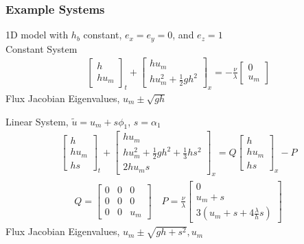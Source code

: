 \documentclass[10pt]{beamer}
\begin{document}
      \begin{frame}
        \frametitle{Example Systems}
        1D model with \(h_b\) constant, \(e_x = e_y = 0\), and \(e_z = 1\) \\
        Constant System
        \begin{align*}
          \begin{bmatrix}
            h \\
            h u_m
          \end{bmatrix}_t +
          \begin{bmatrix}
            h u_m \\
            h u_m^2 + \frac{1}{2} g h^2
          \end{bmatrix}_x =
          -\frac{\nu}{\lambda}
          \begin{bmatrix}
            0 \\
            u_m
          \end{bmatrix}
        \end{align*}
        Flux Jacobian Eigenvalues, \(u_m \pm \sqrt{gh}\)

        Linear System, \(\tilde{u} = u_m + s\phi_1\), \(s = \alpha_1\)
        \begin{align*}
          \begin{bmatrix}
            h \\
            hu_m \\
            hs
          \end{bmatrix}_t +
          \begin{bmatrix}
            h u_m \\
            h u_m^2 + \frac{1}{2} gh^2 + \frac{1}{3}hs^2 \\
            2 h u_m s
          \end{bmatrix}_x = Q
          \begin{bmatrix}
            h \\
            hu_m \\
            hs
          \end{bmatrix}_x - P
        \end{align*}
        \begin{align*}
          Q =
          \begin{bmatrix}
            0 & 0 & 0 \\
            0 & 0 & 0 \\
            0 & 0 & u_m
          \end{bmatrix} \quad
          P = \frac{\nu}{\lambda}
          \begin{bmatrix}
            0 \\
            u_m + s \\
            3(u_m + s + 4\frac{\lambda}{h}s)
          \end{bmatrix}
        \end{align*}
        Flux Jacobian Eigenvalues, \(u_m \pm \sqrt{gh + s^2}, u_m\)
      \end{frame}
\end{document}
